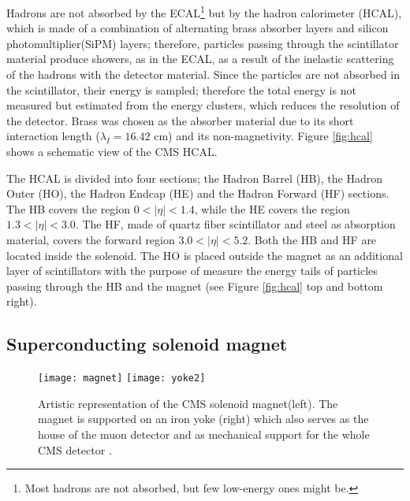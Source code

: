 Hadrons are not absorbed by the ECAL\footnote{Most hadrons are not absorbed, but few low-energy ones might be.} but by the hadron calorimeter (HCAL), which is made of a combination of alternating brass absorber layers and silicon photomultiplier(SiPM) layers; therefore, particles passing through the scintillator material produce showers, as in the ECAL, as a result of the inelastic scattering of the hadrons with the detector material. Since the particles are not absorbed in the scintillator, their energy is sampled; therefore the total energy is not measured but estimated from the energy clusters, which reduces the resolution of the detector. Brass was chosen as the absorber material due to its short interaction length ($\lambda_I=16.42$ cm) and its non-magnetivity. Figure \ref{fig:hcal} shows a schematic view of the CMS HCAL.

The HCAL is divided into four sections; the Hadron Barrel (HB), the Hadron Outer (HO), the Hadron Endcap (HE) and the Hadron Forward (HF) sections. The HB covers the region $0<|\eta|<1.4$, while the HE covers the region $1.3<|\eta|<3.0$. The HF, made of quartz fiber scintillator and steel as absorption material, covers the forward region $3.0<|\eta|<5.2$. Both the HB and HF are located inside the solenoid. The HO is placed outside the magnet as an additional layer of scintillators with the purpose of measure the energy tails of particles passing through the HB and the magnet (see Figure \ref{fig:hcal} top and bottom right).%

\subsection{Superconducting solenoid magnet}

\begin{figure}[h!]
  \centering
  \texttt{[image: magnet]}
  \texttt{[image: yoke2]}
  \caption[CMS solenoid magnet]{Artistic representation of the CMS solenoid magnet(left). The magnet is supported on an iron yoke (right) which also serves as the house of the muon detector and as mechanical support for the whole CMS detector \cite{yoke2}.}
  \label{fig:yoke}
\end{figure}

